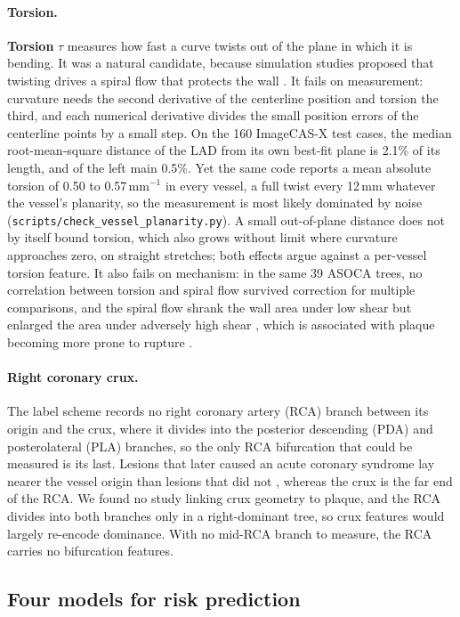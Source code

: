 \paragraph{Torsion.}
\textbf{Torsion} $\tau$ measures how fast a curve twists out of the plane in which it is bending.
It was a natural candidate, because simulation studies proposed that twisting drives a spiral flow that protects the wall \cite{shen2026geometry}.
It fails on measurement: curvature needs the second derivative of the centerline position and torsion the third, and each numerical derivative divides the small position errors of the centerline points by a small step.
On the 160 ImageCAS-X test cases, the median root-mean-square distance of the LAD from its own best-fit plane is 2.1\% of its length, and of the left main 0.5\%.
Yet the same code reports a mean absolute torsion of 0.50 to 0.57\,mm$^{-1}$ in every vessel, a full twist every 12\,mm whatever the vessel's planarity, so the measurement is most likely dominated by noise (\texttt{scripts/check\_vessel\_planarity.py}).
A small out-of-plane distance does not by itself bound torsion, which also grows without limit where curvature approaches zero, on straight stretches; both effects argue against a per-vessel torsion feature.
It also fails on mechanism: in the same 39 ASOCA trees, no correlation between torsion and spiral flow survived correction for multiple comparisons, and the spiral flow shrank the wall area under low shear but enlarged the area under adversely high shear \cite{shen2025helical}, which is associated with plaque becoming more prone to rupture \cite{bajraktari2021highwss}.

\paragraph{Right coronary crux.}
The label scheme records no right coronary artery (RCA) branch between its origin and the crux, where it divides into the posterior descending (PDA) and posterolateral (PLA) branches, so the only RCA bifurcation that could be measured is its last.
Lesions that later caused an acute coronary syndrome lay nearer the vessel origin than lesions that did not \cite{han2022plaque}, whereas the crux is the far end of the RCA.
We found no study linking crux geometry to plaque, and the RCA divides into both branches only in a right-dominant tree, so crux features would largely re-encode dominance.
With no mid-RCA branch to measure, the RCA carries no bifurcation features.

\subsection{Four models for risk prediction}

